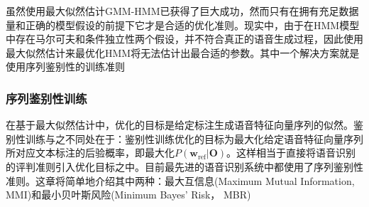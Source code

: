 虽然使用最大似然估计GMM-HMM已获得了巨大成功，然而只有在拥有充足数据量和正确的模型假设的前提下它才是合适的优化准则。现实中，由于在HMM模型中存在马尔可夫和条件独立性两个假设，并不符合真正的语音生成过程，因此使用最大似然估计来最优化HMM将无法估计出最合适的参数。其中一个解决方案就是使用序列鉴别性的训练准则~\cite{bahl1986maximum,schluter2001comparison,chou1993minimum,goel2000minimum,juang1997minimum,povey2005discriminative,povey2001improved}

\subsubsection{序列鉴别性训练}
在基于最大似然估计中，优化的目标是给定标注生成语音特征向量序列的似然。鉴别性训练与之不同处在于：鉴别性训练优化的目标为最大化给定语音特征向量序列所对应文本标注的后验概率，即最大化$P(\mathbf{w}_{\text{ref}}|\mathbf{O})$。这样相当于直接将语音识别的评判准则引入优化目标之中。目前最先进的语音识别系统中都使用了序列鉴别性准则。这章将简单地介绍其中两种：最大互信息(Maximum Mutual Information, MMI)和最小贝叶斯风险(Minimum Bayes' Risk， MBR)
